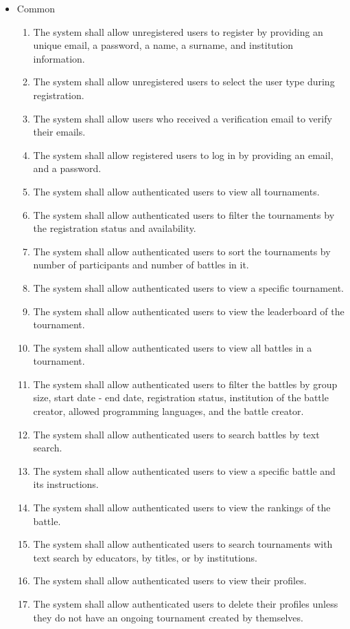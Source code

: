 \begin{itemize}
	\item Common
	\begin{enumerate}
		\item The system shall allow unregistered users to register by providing an unique email, a password, a name, a surname, and institution information.
            \item The system shall allow unregistered users to select the user type during registration.
  \item The system shall allow users who received a verification email to verify their emails.
  \item The system shall allow registered users to log in by providing an email, and a password.
  \item The system shall allow authenticated users to view all tournaments.
  \item The system shall allow authenticated users to filter the tournaments by the registration status and availability. 
  \item The system shall allow authenticated users to sort the tournaments by number of participants and number of battles in it.
  \item The system shall allow authenticated users to view a specific tournament.
  \item The system shall allow authenticated users to view the leaderboard of the tournament.
  \item The system shall allow authenticated users to view all battles in a tournament.
  \item The system shall allow authenticated users to filter the battles by group size, start date - end date, registration status, institution of the battle creator, allowed programming languages, and the battle creator.
  \item The system shall allow authenticated users to search battles by text search.
  \item The system shall allow authenticated users to view a specific battle and its instructions.
  \item The system shall allow authenticated users to view the rankings of the battle.
  \item The system shall allow authenticated users to search tournaments with text search by educators, by titles, or by institutions.
  \item The system shall allow authenticated users to view their profiles.
  \item The system shall allow authenticated users to delete their profiles unless they do not have an ongoing tournament created by themselves.

\end{enumerate}
\end{itemize}
